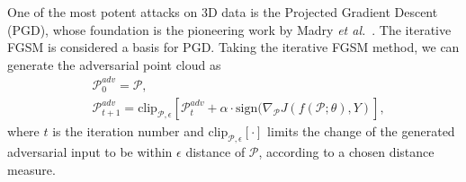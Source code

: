 \documentclass{ieeeaccess}
\def\etal{\textit{et al.}}
\newcommand{\sign}{\text{sign}}
\begin{document}
One of the most potent attacks on 3D data is the Projected Gradient Descent (PGD), whose foundation is the pioneering work by Madry \etal~\cite{madry2019deep}. The iterative FGSM is considered a basis for PGD.
Taking the iterative FGSM method, we can generate the adversarial point cloud as
\begin{equation}
\begin{split}
    &\mathcal{P}^{adv}_{0} = \mathcal{P}, \\ &\mathcal{P}^{adv}_{t+1} = \text{clip}_{\mathcal{P},\epsilon}\left[\mathcal{P}^{adv}_t+\alpha \cdot \sign(\nabla_\mathcal{P}J(f(\mathcal{P};\theta),Y)\right],
\end{split}
\label{eq:10}
\end{equation}
where $t$ is the iteration number and $\text{clip}_{\mathcal{P},\epsilon}[\cdot]$ limits the change of the generated adversarial input to be within $\epsilon$ distance of $\mathcal{P}$, according to a chosen distance measure. %


\end{document}
